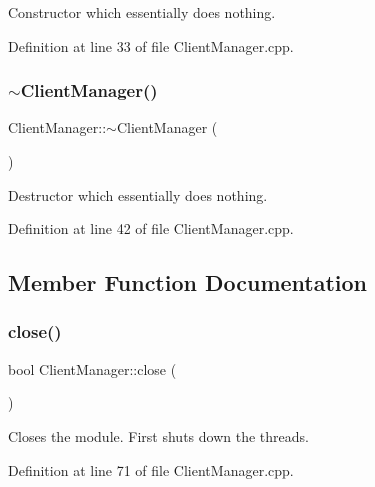 Constructor which essentially does nothing. 

Definition at line 33 of file Client\+Manager.\+cpp.

\hypertarget{classocra__recipes_1_1ClientManager_af605d4fa9dab04b9874bf307277cd8a3}{}\label{classocra__recipes_1_1ClientManager_af605d4fa9dab04b9874bf307277cd8a3} 
\subsubsection{\texorpdfstring{$\sim$\+Client\+Manager()}{~ClientManager()}}
{\footnotesize\ttfamily Client\+Manager\+::$\sim$\+Client\+Manager (\begin{DoxyParamCaption}{ }\end{DoxyParamCaption})}

Destructor which essentially does nothing. 

Definition at line 42 of file Client\+Manager.\+cpp.



\subsection{Member Function Documentation}
\hypertarget{classocra__recipes_1_1ClientManager_ace715a5dc663e956edc24d976cc7ad09}{}\label{classocra__recipes_1_1ClientManager_ace715a5dc663e956edc24d976cc7ad09} 
\subsubsection{\texorpdfstring{close()}{close()}}
{\footnotesize\ttfamily bool Client\+Manager\+::close (\begin{DoxyParamCaption}{ }\end{DoxyParamCaption})}

Closes the module. First shuts down the threads. 

Definition at line 71 of file Client\+Manager.\+cpp.

\hypertarget{classocra__recipes_1_1ClientManager_a341d7c03d2c2b645f9b815f02baf323e}{}\label{classocra__recipes_1_1ClientManager_a341d7c03d2c2b645f9b815f02baf323e} 
